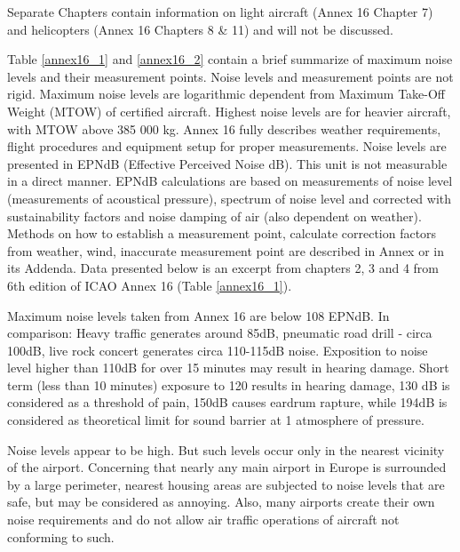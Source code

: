 Separate Chapters contain information on light aircraft (Annex 16 Chapter 7) and helicopters (Annex 16 Chapters 8 \& 11) and will not be discussed.

Table \ref{annex16_1} and \ref{annex16_2} contain a brief summarize of maximum noise levels and their measurement points. Noise levels and measurement points are not rigid. Maximum noise levels are logarithmic dependent from Maximum Take-Off Weight (MTOW) of certified aircraft. Highest noise levels are for heavier aircraft, with MTOW above 385 000 kg. Annex 16 fully describes weather requirements, flight procedures and equipment setup for proper measurements. Noise levels are presented in EPNdB (Effective Perceived Noise dB). This unit is not measurable in a direct manner. EPNdB calculations are based on measurements of noise level (measurements of acoustical pressure), spectrum of noise level and corrected with sustainability factors and noise damping of air (also dependent on weather). Methods on how to establish a measurement point, calculate correction factors from weather, wind, inaccurate measurement point are described in Annex or in its Addenda. Data presented below is an excerpt from chapters 2, 3 and 4 from 6th edition of ICAO Annex 16 (Table \ref{annex16_1}).

Maximum noise levels taken from Annex 16 are below 108 EPNdB. In comparison: Heavy traffic generates around 85dB, pneumatic road drill - circa 100dB, live rock concert generates circa 110-115dB noise. Exposition to noise level higher than 110dB for over 15 minutes may result in hearing damage. Short term (less than 10 minutes) exposure to 120 results in hearing damage, 130 dB is considered as a threshold of pain, 150dB causes eardrum rapture, while 194dB is considered as theoretical limit for sound barrier at 1 atmosphere of pressure.

Noise levels appear to be high. But such levels occur only in the nearest vicinity of the airport. Concerning that nearly any main airport in Europe is surrounded by a large perimeter, nearest housing areas are subjected to noise levels that are safe, but may be considered as annoying. Also, many airports create their own noise requirements and do not allow air traffic operations of aircraft not conforming to such.

